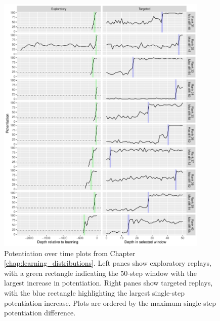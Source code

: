 \begin{figure}[!h]
    \begin{center}
    \includegraphics[width=0.9\textwidth]{07_appendix_potentiation_over_time/media/reps_31_40.pdf}
    \caption{Potentiation over time plots from Chapter \ref{chap:learning_distributions}.
    Left panes show exploratory replays, with a green rectangle indicating the 50-step window with the largest increase in potentiation. 
    Right panes show targeted replays, with the blue rectangle highlighting the largest single-step potentiation increase.
    Plots are ordered by the maximum single-step potentiation difference.}
    \label{fig:app_a_31_40}
    \end{center}
\end{figure}

